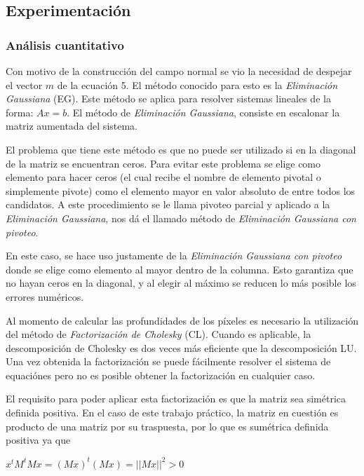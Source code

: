\subsection{Experimentación}

\subsubsection{Análisis cuantitativo}

Con motivo de la construcción del campo normal se vio la necesidad de despejar el vector $m$ de la ecuación 5. El método conocido para esto es la \textit{Eliminación Gaussiana} (EG). Este método se aplica para resolver sistemas lineales de la forma: $Ax = b$. El método de \textit{Eliminación Gaussiana}, consiste en escalonar la matriz aumentada del sistema.

El problema que tiene este método es que no puede ser utilizado si en la diagonal de la matriz se encuentran ceros. Para evitar este problema se elige como elemento para hacer ceros (el cual recibe el nombre de elemento pivotal o simplemente pivote) como el elemento mayor en valor absoluto de entre todos los candidatos. A este procedimiento se le llama pivoteo parcial y aplicado a la \textit{Eliminación Gaussiana}, nos dá el llamado método de \textit{Eliminación Gaussiana con pivoteo}.

En este caso, se hace uso justamente de la \textit{Eliminación Gaussiana con pivoteo} donde se elige como elemento al mayor dentro de la columna. Esto garantiza que no hayan ceros en la diagonal, y al elegir al máximo se reducen lo más posible los errores numéricos.

Al momento de calcular las profundidades de los píxeles es necesario la utilización del método de \textit{Factorización de Cholesky} (CL). Cuando es aplicable, la descomposición de Cholesky es dos veces más eficiente que la descomposición LU. Una vez obtenida la factorización se puede fácilmente resolver el sistema de equaciónes pero no es posible obtener la factorización en cualquier caso.

El requisito para poder aplicar esta factorización es que la matriz sea simétrica definida positiva. En el caso de este trabajo práctico, la matriz en cuestión es producto de una matriz por su traspuesta, por lo que es sumétrica definida positiva ya que

\begin{center}
$x^tM^tMx = (Mx)^t(Mx) = ||Mx||^2 > 0$
\end{center}

